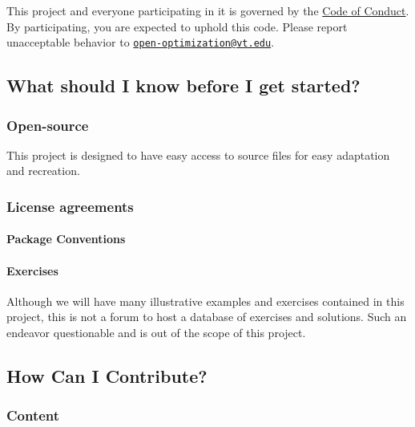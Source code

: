 This project and everyone participating in it is governed by the
\href{CODE_OF_CONDUCT.md}{Code of Conduct}. By participating, you are
expected to uphold this code. Please report unacceptable behavior to
\href{mailto:open-optimization@vt.edu}{\nolinkurl{open-optimization@vt.edu}}.

\hypertarget{what-should-i-know-before-i-get-started}{%
\subsection{What should I know before I get
started?}\label{what-should-i-know-before-i-get-started}}

\hypertarget{open-source}{%
\subsubsection{Open-source}\label{open-source}}

This project is designed to have easy access to source files for easy
adaptation and recreation.

\hypertarget{license-agreements}{%
\subsubsection{License agreements}\label{license-agreements}}

\hypertarget{package-conventions}{%
\paragraph{Package Conventions}\label{package-conventions}}

\hypertarget{exercises}{%
\paragraph{Exercises}\label{exercises}}

Although we will have many illustrative examples and exercises contained
in this project, this is not a forum to host a database of exercises and
solutions. Such an endeavor questionable and is out of the scope of this
project.

\hypertarget{how-can-i-contribute}{%
\subsection{How Can I Contribute?}\label{how-can-i-contribute}}

\hypertarget{content}{%
\subsubsection{Content}\label{content}}

